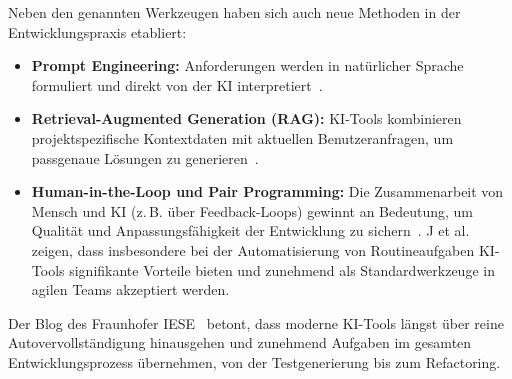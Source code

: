 Neben den genannten Werkzeugen haben sich auch neue Methoden in der
Entwicklungspraxis etabliert:
\begin{itemize}
    \item \textbf{Prompt Engineering:} Anforderungen werden in natürlicher Sprache formuliert und direkt von der KI interpretiert~\cite{esposito_generative_2025}.
    \item \textbf{Retrieval-Augmented Generation (RAG):} KI-Tools kombinieren projektspezifische Kontextdaten mit aktuellen Benutzeranfragen, um passgenaue Lösungen zu generieren~\cite{esposito_generative_2025}.
    \item \textbf{Human-in-the-Loop und Pair Programming:} Die Zusammenarbeit von Mensch und KI (z.\,B. über Feedback-Loops) gewinnt an Bedeutung, um Qualität und Anpassungsfähigkeit der Entwicklung zu sichern~\cite{nguyen-duc_generative_2023,siebert_generative_2024}. J et al.~\cite{j_integration_2023} zeigen, dass insbesondere bei der Automatisierung von Routineaufgaben KI-Tools signifikante Vorteile bieten und zunehmend als Standardwerkzeuge in agilen Teams akzeptiert werden.
\end{itemize}

Der Blog des Fraunhofer IESE~\cite{siebert_generative_2024} betont, dass
moderne KI-Tools längst über reine Autovervollständigung hinausgehen und
zunehmend Aufgaben im gesamten Entwicklungsprozess übernehmen, von der
Testgenerierung bis zum Refactoring.